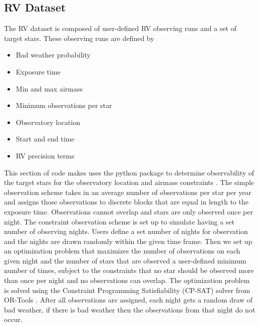 \subsection{RV Dataset}

The RV dataset is composed of user-defined RV observing runs and a set of
target stars. These observing runs are defined by
\begin{itemize}
  \item Bad weather probability
  \item Exposure time
  \item Min and max airmass
  \item Minimum observations per star
  \item Observatory location
  \item Start and end time
  \item RV precision terms
\end{itemize}
This section of code makes uses the  python package to
determine observability of the target stars for the observatory location and
airmass constraints \citep{morrisAstroplanOpen2018}. The simple observation
scheme takes in an average number of observations per star per year and assigns
those observations to discrete blocks that are equal in length to the exposure
time. Observations cannot overlap and stars are only observed once per night.
The constraint observation scheme is set up to simulate having a set number of
observing nights. Users define a set number of nights for observation and the
nights are drawn randomly within the given time frame. Then we set up an
optimization problem that maximizes the number of observations on each given
night and the number of stars that are observed a user-defined minimum number
of times, subject to the constraints that no star should be observed more than
once per night and no observations can overlap. The optimization problem is
solved using the Constraint Programming Satisfiability (CP-SAT) solver from
OR-Tools \citep{perronORTools2022}. After all observations are assigned, each
night gets a random draw of bad weather, if there is bad weather then the
observations from that night do not occur.

